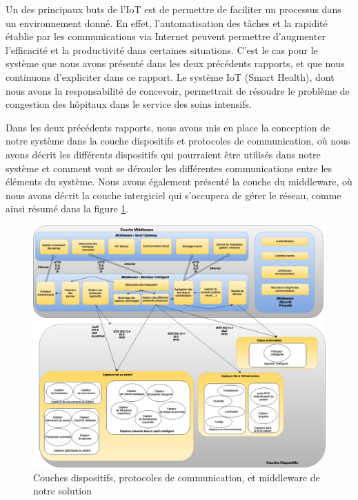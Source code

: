 Un des principaux buts de l’IoT est de permettre de faciliter un processus dans un environnement donné. En effet, l’automatisation
des tâches et la rapidité établie par les communications via Internet peuvent permettre d’augmenter l’efficacité et la
productivité dans certaines situations. C’est le cas pour le système que nous avons présenté dans les deux précédents rapports, et
que nous continuons d’expliciter dans ce rapport. Le système IoT (Smart Health), dont nous avons la responsabilité de concevoir,
permettrait de résoudre le problème de congestion des hôpitaux dans le service des soins intensifs.  
\newline

Dans les deux précédents rapports, nous avons mis en place la conception de notre système dans la couche dispositifs et protocoles
de communication, où nous avons décrit les différents dispositifs qui pourraient être utilisés dans notre système et comment vont
se dérouler les différentes communications entre les éléments du système. Nous avons également présenté la couche du middleware, où nous avons
décrit la couche intergiciel qui s’occupera de gérer le réseau, comme ainsi résumé dans la figure \ref{DispositifsMiddleware}.  
\newline
\begin{figure}[h!]
	\hspace*{-2.5cm}
	\centering
	\includegraphics[width=1.4\textwidth]{DispositifsMiddleware.png}
	\caption{Couches dispositifs, protocoles de communication, et middleware de notre solution}
	\label{DispositifsMiddleware}
\end{figure}

